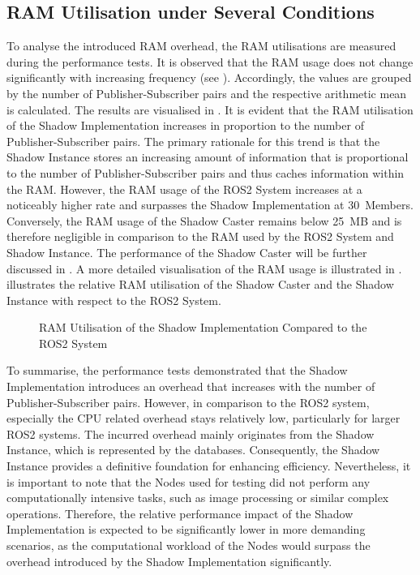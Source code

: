     \subsection{RAM Utilisation under Several Conditions} \label{subsec:evaluation:ramutilisation}
    To analyse the introduced RAM overhead, the RAM utilisations are measured during the performance tests. It is observed that the RAM usage does not change significantly with increasing frequency (see ). Accordingly, the values are grouped by the number of Publisher-Subscriber pairs and the respective arithmetic mean is calculated. The results are visualised in . It is evident that the RAM utilisation of the Shadow Implementation increases in proportion to the number of Publisher-Subscriber pairs.\newline
    The primary rationale for this trend is that the Shadow Instance stores an increasing amount of information that is proportional to the number of Publisher-Subscriber pairs and thus caches information within the RAM. However, the RAM usage of the ROS2 System increases at a noticeably higher rate and surpasses the Shadow Implementation at 30~Members. Conversely, the RAM usage of the Shadow Caster remains below 25~MB and is therefore negligible in comparison to the RAM used by the ROS2 System and Shadow Instance. The performance of the Shadow Caster will be further discussed in . A more detailed visualisation of the RAM usage is illustrated in .  illustrates the relative RAM utilisation of the Shadow Caster and the Shadow Instance with respect to the ROS2 System.
    \begin{figure}[h]
        \centering
        
        \caption{RAM Utilisation of the Shadow Implementation Compared to the ROS2 System} \label{fig:tikz:eval:ramUsageAggregated}
    \end{figure}

    To summarise, the performance tests demonstrated that the Shadow Implementation introduces an overhead that increases with the number of Publisher-Subscriber pairs. However, in comparison to the ROS2 system, especially the CPU related overhead stays relatively low, particularly for larger ROS2 systems. The incurred overhead mainly originates from the Shadow Instance, which is represented by the databases. Consequently, the Shadow Instance provides a definitive foundation for enhancing efficiency.
    Nevertheless, it is important to note that the Nodes used for testing did not perform any computationally intensive tasks, such as image processing or similar complex operations. Therefore, the relative performance impact of the Shadow Implementation is expected to be significantly lower in more demanding scenarios, as the computational workload of the Nodes would surpass the overhead introduced by the Shadow Implementation significantly.

